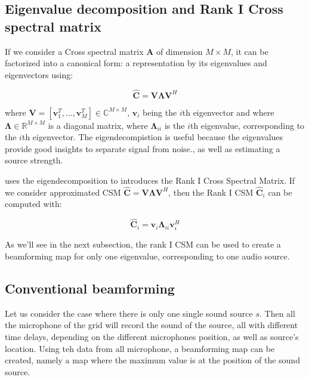 \documentclass{article}
\begin{document}
\subsection{Eigenvalue decomposition and Rank I Cross spectral matrix}

If we consider a Cross spectral matrix $\mathbf{A}$ of dimension $M \times M$, it can be factorized into a canonical form: a representation by its eigenvalues and eigenvectors using:

\begin{equation}
    \hat{\mathbf{C}} = \mathbf{V} \mathbf{\Lambda} \mathbf{V}^H
\end{equation}

where $\mathbf{V} = [\mathbf{v}_1^T, \dots, \mathbf{v}_M^T] \in \mathbb{C}^{M \times M}$, $\mathbf{v}_i$ being the $i$th eigenvector and where $\mathbf{\Lambda} \in \mathbb{R}^{M \times M}$ is a diagonal matrix, where $\mathbf{\Lambda}_{ii}$ is the $i$th eigenvalue, corresponding to the $i$th eigenvector. The eigendecompistion is useful because the eigenvalues provide good insights to separate signal from noise., as well as estimating a source strength. 

\cite{sarradj2010fast} uses the eigendecomposition to introduces the Rank I Cross Spectral Matrix. If we consider approximated CSM $\hat{\mathbf{C}} = \mathbf{V} \mathbf{\Lambda} \mathbf{V}^H$, then the Rank I CSM $\hat{\mathbf{C}}_i$ can be computed with:

\begin{equation}
    \hat{\mathbf{C}}_i = \mathbf{v}_i \mathbf{\Lambda}_{ii} \mathbf{v}_{i}^{H}
\end{equation}

As we'll see in the next subsection, the rank I CSM can be used to create a beamforming map for only one eigenvalue, corresponding to one audio source. 


\subsection{Conventional beamforming}

Let us consider the case where there is only one single sound source $s$. Then all the microphone of the grid will record the sound of the source, all with different time delays, depending on the different microphones position, as well as source's location. Using teh data from all microphone, a beamforming map can be created, namely a map where the maximum value is at the position of the sound source.
\end{document}
